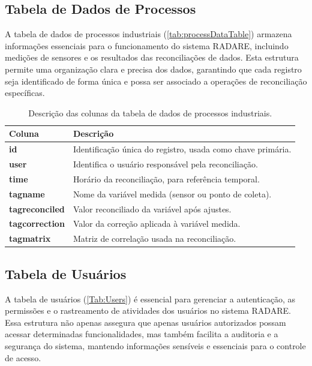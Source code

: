 \subsection{Tabela de Dados de Processos}

A tabela de dados de processos industriais (\autoref{tab:processDataTable}) armazena informações essenciais para o funcionamento do sistema RADARE, incluindo medições de sensores e os resultados das reconciliações de dados. Esta estrutura permite uma organização clara e precisa dos dados, garantindo que cada registro seja identificado de forma única e possa ser associado a operações de reconciliação específicas.

\begin{table}[htbp]
    \centering
    \caption{Descrição das colunas da tabela de dados de processos industriais.}
    \label{tab:processDataTable}
    \begin{tabular}{|l|p{10cm}|}
        \hline
        \textbf{Coluna} & \textbf{Descrição} \\ \hline
        \textbf{id} & Identificação única do registro, usada como chave primária. \\ \hline
        \textbf{user} & Identifica o usuário responsável pela reconciliação. \\ \hline
        \textbf{time} & Horário da reconciliação, para referência temporal. \\ \hline
        \textbf{tagname} & Nome da variável medida (sensor ou ponto de coleta). \\ \hline
        \textbf{tagreconciled} & Valor reconciliado da variável após ajustes. \\ \hline
        \textbf{tagcorrection} & Valor da correção aplicada à variável medida. \\ \hline
        \textbf{tagmatrix} & Matriz de correlação usada na reconciliação. \\ \hline
    \end{tabular}
\end{table}


\subsection{Tabela de Usuários}

A tabela de usuários (\autoref{Tab:Users}) é essencial para gerenciar a autenticação, as permissões e o rastreamento de atividades dos usuários no sistema RADARE. Essa estrutura não apenas assegura que apenas usuários autorizados possam acessar determinadas funcionalidades, mas também facilita a auditoria e a segurança do sistema, mantendo informações sensíveis e essenciais para o controle de acesso.

